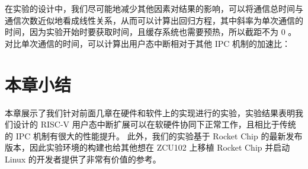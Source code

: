 在实验的设计中，我们尽可能地减少其他因素对结果的影响，可以将通信总时间与通信次数近似地看成线性关系，从而可以计算出回归方程，其中斜率为单次通信的时间，因为实验开始时要获取时间，且缓存系统也需要预热，所以截距不为 0 。对比单次通信的时间，可以计算出用户态中断相对于其他 IPC 机制的加速比：

\section{本章小结}

本章展示了我们针对前面几章在硬件和软件上的实现进行的实验，实验结果表明我们设计的 RISC-V 用户态中断扩展可以在软硬件协同下正常工作，且相比于传统的 IPC 机制有很大的性能提升。 此外，我们的实验基于 Rocket Chip 的最新发布版本，因此实验环境的构建也给其他想在 ZCU102 上移植 Rocket Chip 并启动 Linux 的开发者提供了非常有价值的参考。